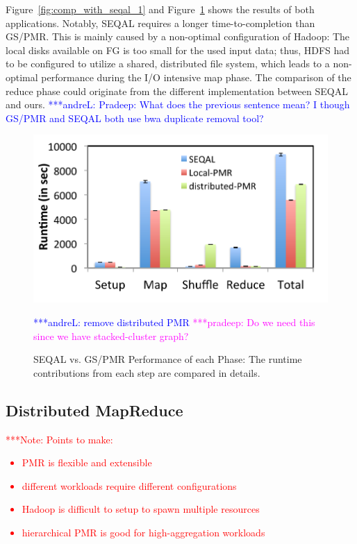 \documentclass{acm_proc_article-sp}
\newcommand{\alnote}[1]{ {\textcolor{blue} { ***andreL: #1 }}}
\newcommand{\pnote}[1]{ {\textcolor{magenta} { ***pradeep: #1 }}}
\newcommand{\note}[1]{ {\textcolor{red} { ***Note: #1 }}}
\newcommand{\alnote}[1]{}
\newcommand{\pnote}[1]{}
\newcommand{\note}[1]{}
\begin{document}
Figure~\ref{fig:comp_with_seqal_1} and Figure~\ref{fig:comp_with_seqal_2}
shows the results of both applications. Notably, SEQAL requires a longer
time-to-completion than GS/PMR. This is mainly caused by a non-optimal
configuration of Hadoop: The local disks available on FG is too small for the
used input data; thus, HDFS had to be configured to utilize a shared,
distributed file system, which leads to a non-optimal performance during the
I/O intensive map phase.  The comparison of the reduce phase could originate 
from the different implementation between SEQAL and ours. \alnote{Pradeep: 
What does the previous sentence mean? I though GS/PMR and SEQAL both use bwa 
duplicate removal tool?}



\begin{figure} 
 \centering
\includegraphics[scale=0.50]{figures/8GB_phasewisetimes.pdf}
\caption{SEQAL vs. GS/PMR Performance of each Phase:  The runtime  contributions from each step are compared in details.}
\alnote{remove distributed PMR }
\pnote{ Do we need this since we have stacked-cluster graph?}
 \label{fig:comp_with_seqal_2} 
\end{figure}


\subsection{Distributed MapReduce}
\note{Points to make:
\begin{itemize}
	\item PMR is flexible and extensible
	\item different workloads require different configurations
	\item Hadoop is difficult to setup to spawn multiple resources
	\item hierarchical PMR is good for high-aggregation workloads
\end{itemize}}
\end{document}
